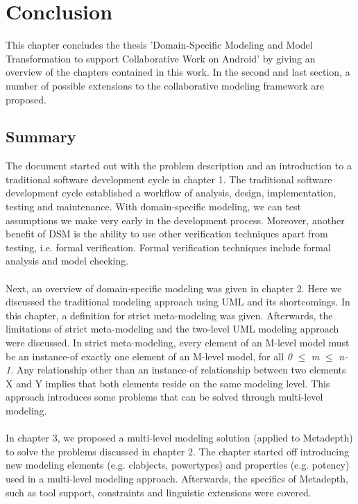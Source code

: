 \chapter{Conclusion}

This chapter concludes the thesis 'Domain-Specific Modeling and Model Transformation to support Collaborative Work on Android' by giving an overview of the chapters contained in this work. In the second and last section, a number of possible extensions to the collaborative modeling framework are proposed. 

\section{Summary}

The document started out with the problem description and an introduction to a traditional software development cycle in chapter 1. The traditional software development cycle established a workflow of analysis, design, implementation, testing and maintenance. With domain-specific modeling, we can  test assumptions we make very early in the development process. Moreover, another benefit of DSM is the ability to use other verification techniques apart from testing, i.e. formal verification. Formal verification techniques include formal analysis and model checking. \\ \\
Next, an overview of domain-specific modeling was given in chapter 2. Here we discussed the traditional modeling approach using UML and its shortcomings. In this chapter, a definition for strict meta-modeling was given. Afterwards, the limitations of strict meta-modeling and the two-level UML modeling approach were discussed. In strict meta-modeling, every element of an M-level model must be an instance-of exactly one element of an M-level model, for all \textit{0} $\leq$ \textit{m} $\le$ \textit{n-1}. Any relationship other than an instance-of relationship between two elements X and Y implies that both elements reside on the same modeling level. This approach introduces some problems that can be solved through multi-level modeling. \\ \\
In chapter 3, we proposed a multi-level modeling solution (applied to Metadepth) to solve the problems discussed in chapter 2. The chapter started off introducing new modeling elements (e.g. clabjects, powertypes) and properties (e.g. potency) used in a multi-level modeling approach. Afterwards, the specifics of Metadepth, such as tool support, constraints and linguistic extensions were covered. \\ \\
